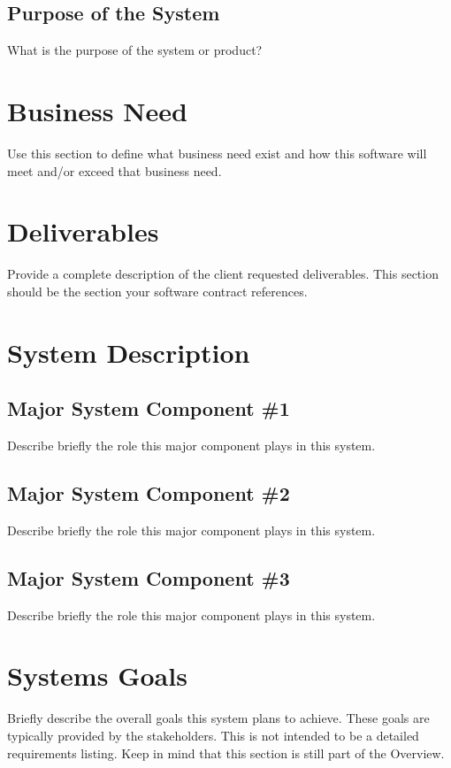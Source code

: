 \subsection{Purpose of the System}
What is the purpose of the system or product? 


\section{Business Need}
Use this section to define what business need exist and how this software will 
meet and/or exceed that business need.   


\section{Deliverables}

Provide a complete description of the client requested deliverables.   This section should be the section your software contract references.   

\section{System Description}

\subsection{Major System Component \#1}
Describe briefly the role this major component plays in this system. 

\subsection{Major System Component \#2}
Describe briefly the role this major component plays in this system. 

\subsection{Major System Component \#3}
Describe briefly the role this major component plays in this system. 

\section{Systems Goals}
Briefly describe the overall goals this system plans to achieve.
These goals are typically provided by the stakeholders.  This is not
intended to be a detailed requirements listing.  Keep in mind that
this section is still part of the Overview.

